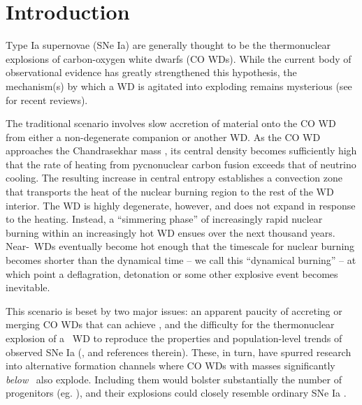 \section{Introduction}
\label{sec:c5_intro}

Type Ia supernovae (SNe Ia) are generally thought to be the thermonuclear explosions of carbon-oxygen white dwarfs (CO WDs).  While the current body of observational evidence has greatly strengthened this hypothesis, the mechanism(s) by which a WD is agitated into exploding remains mysterious (see \citealt{howe11, hill+13, maozmn14} for recent reviews).  

The traditional scenario involves slow accretion of material onto the CO WD from either a non-degenerate companion or another WD.  As the CO WD approaches the Chandrasekhar mass \Mch, its central density becomes sufficiently high that the rate of heating from pycnonuclear carbon fusion exceeds that of neutrino cooling.  The resulting increase in central entropy establishes a convection zone that transports the heat of the nuclear burning region to the rest of the WD interior.  The WD is highly degenerate, however, and does not expand in response to the heating.  Instead, a ``simmering phase'' of increasingly rapid nuclear burning within an increasingly hot WD ensues over the next thousand years.  Near-\Mch\ WDs eventually become hot enough that the timescale for nuclear burning becomes shorter than the dynamical time -- we call this ``dynamical burning'' -- at which point a deflagration, detonation or some other explosive event becomes inevitable.

This scenario is beset by two major issues: an apparent paucity of accreting or merging CO WDs that can achieve \Mch, and the difficulty for the thermonuclear explosion of a \Mch\ WD to reproduce the properties and population-level trends of observed SNe Ia (\citeal{vkercj10}, and references therein).  These, in turn, have spurred research into alternative formation channels where CO WDs with masses significantly \textit{below} \Mch\ also explode.  Including them would bolster substantially the number of progenitors (eg. \citealt{badem12}), and their explosions could closely resemble ordinary SNe Ia \citep{shig+92, sim+10}.

